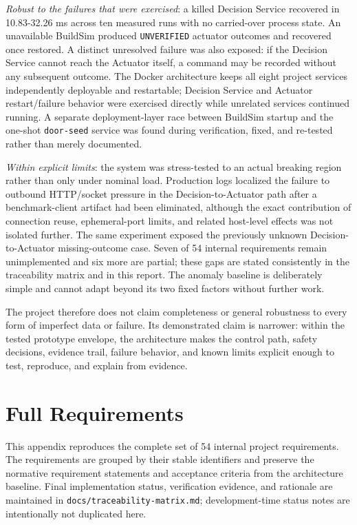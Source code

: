 \documentclass[11pt]{article}
\begin{document}
\emph{Robust to the failures that were exercised}: a killed Decision
Service recovered in 10.83-32.26 ms across ten measured runs with no
carried-over process state. An unavailable BuildSim produced
\texttt{UNVERIFIED} actuator outcomes and recovered once restored. A
distinct unresolved failure was also exposed: if the Decision Service
cannot reach the Actuator itself, a command may be recorded without any
subsequent outcome. The Docker architecture keeps all eight project
services independently deployable and restartable; Decision Service and
Actuator restart/failure behavior were exercised directly while
unrelated services continued running. A separate deployment-layer race
between BuildSim startup and the one-shot \texttt{door-seed} service was
found during verification, fixed, and re-tested rather than merely
documented.

\emph{Within explicit limits}: the system was stress-tested to an actual
breaking region rather than only under nominal load. Production logs
localized the failure to outbound HTTP/socket pressure in the
Decision-to-Actuator path after a benchmark-client artifact had been
eliminated, although the exact contribution of connection reuse,
ephemeral-port limits, and related host-level effects was not isolated
further. The same experiment exposed the previously unknown
Decision-to-Actuator missing-outcome case. Seven of 54 internal
requirements remain unimplemented and six more are partial; these gaps
are stated consistently in the traceability matrix and in this report.
The anomaly baseline is deliberately simple and cannot adapt beyond its
two fixed factors without further work.

The project therefore does not claim completeness or general robustness
to every form of imperfect data or failure. Its demonstrated claim is
narrower: within the tested prototype envelope, the architecture makes
the control path, safety decisions, evidence trail, failure behavior,
and known limits explicit enough to test, reproduce, and explain from
evidence.

\clearpage
\appendix

\section{Full Requirements}
\label{app:requirements}

This appendix reproduces the complete set of 54 internal project requirements.
The requirements are grouped by their stable identifiers and preserve the
normative requirement statements and acceptance criteria from the architecture
baseline. Final implementation status, verification evidence, and rationale are
maintained in \texttt{docs/traceability-matrix.md}; development-time status notes
are intentionally not duplicated here.
\end{document}
